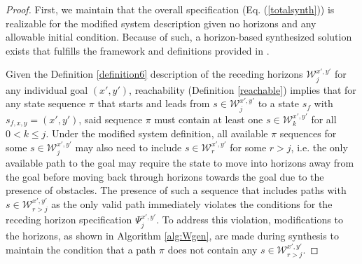 \documentclass{ieeeaccess}
\begin{document}
\begin{proof}
	First, we maintain that the overall specification (Eq. (\ref{totalsynth})) is realizable for the modified system description given no horizons and any allowable initial condition. Because of such, a horizon-based synthesized solution exists that fulfills the framework and definitions provided in \cite{c10}. 
	
	
	
	Given the Definition \ref{definition6} description of the receding horizons $\mathcal{W}^{x',y'}_j$ for any individual goal $(x',y')$, reachability (Definition \ref{reachable}) implies that for any state sequence $\pi$ that starts and leads from $s \in \mathcal{W}^{x',y'}_j$ to a state $s_f$ with $s_{f,x,y} = (x',y')$, said sequence $\pi$ must contain at least one $s \in \mathcal{W}^{x',y'}_k$ for all $0 < k \le j$. Under the modified system definition, all available $\pi$ sequences for some $s \in \mathcal{W}^{x',y'}_j$ may also need to include $s \in \mathcal{W}^{x',y'}_r$ for some $r > j$, i.e. the only available path to the goal may require the state to move into horizons away from the goal before moving back through horizons towards the goal due to the presence of obstacles. The presence of such a sequence that includes paths with $s \in \mathcal{W}^{x',y'}_{r > j}$ as the only valid path immediately violates the conditions for the receding horizon specification $\Psi_{j}^{x',y'}$. To address this violation, modifications to the horizons, as shown in Algorithm \ref{alg:Wgen}, are made during synthesis to maintain the condition that a path $\pi$ does not contain any $s \in \mathcal{W}^{x',y'}_{r > j}$.			
	

\end{proof}
\end{document}
